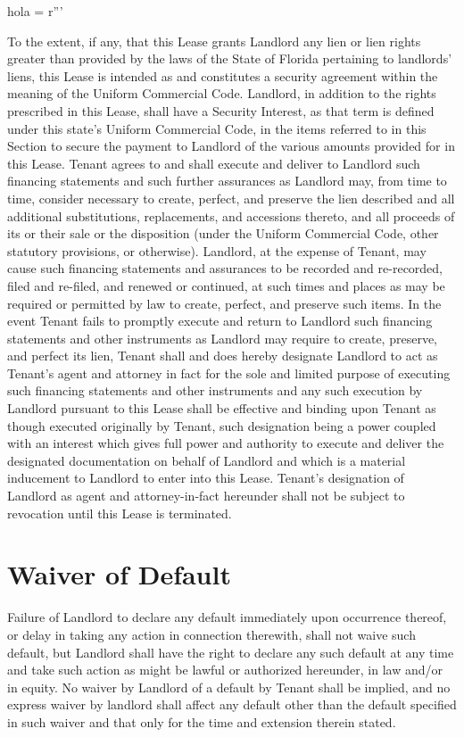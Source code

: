 hola = r'''\documentclass{article}
\begin{document}
    To the extent, if any, that this Lease grants Landlord any lien or lien rights greater than provided by the laws of the State of Florida pertaining to landlords' liens, this Lease is intended as and constitutes a security agreement within the meaning of the Uniform Commercial Code. Landlord, in addition to the rights prescribed in this Lease, shall have a Security Interest, as that term is defined under this state's Uniform Commercial Code, in the items referred to in this Section to secure the payment to Landlord of the various amounts provided for in this Lease. Tenant agrees to and shall execute and deliver to Landlord such financing statements and such further assurances as Landlord may, from time to time, consider necessary to create, perfect, and preserve the lien described and all additional substitutions, replacements, and accessions thereto, and all proceeds of its or their sale or the disposition (under the Uniform Commercial Code, other statutory provisions, or otherwise). Landlord, at the expense of Tenant, may cause such financing statements and assurances to be recorded and re-recorded, filed and re-filed, and renewed or continued, at such times and places as may be required or permitted by law to create, perfect, and preserve such items. In the event Tenant fails to promptly execute and return to Landlord such financing statements and other instruments as Landlord may require to create, preserve, and perfect its lien, Tenant shall and does hereby designate Landlord to act as Tenant's agent and attorney in fact for the sole and limited purpose of executing such financing statements and other instruments and any such execution by Landlord pursuant to this Lease shall be effective and binding upon Tenant as though executed originally by Tenant, such designation being a power coupled with an interest which gives full power and authority to execute and deliver the designated documentation on behalf of Landlord and which is a material inducement to Landlord to enter into this Lease. Tenant's designation of Landlord as agent and attorney-in-fact hereunder shall not be subject to revocation until this Lease is terminated.


\section{Waiver of Default}
    Failure of Landlord to declare any default immediately upon occurrence thereof, or delay in taking any action in connection therewith, shall not waive such default, but Landlord shall have the right to declare any such default at any time and take such action as might be lawful or authorized hereunder, in law and/or in equity. No waiver by Landlord of a default by Tenant shall be implied, and no express waiver by landlord shall affect any default other than the default specified in such waiver and that only for the time and extension therein stated.
\end{document}
